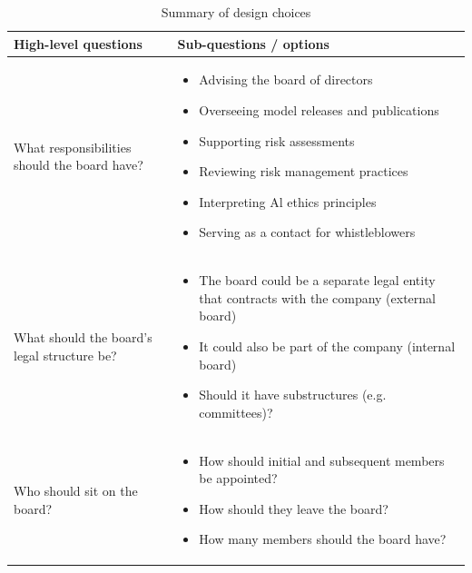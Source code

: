 \documentclass{article}
\begin{document}
\begin{table}
  \caption{Summary of design choices}
  \label{table2}
  \centering
  \begin{tabularx}{\textwidth}{p{4.5cm} X}
    \toprule
        \textbf{High-level questions} & \textbf{Sub-questions / options} \\
    \midrule
        What responsibilities should the board have? &
            \vspace{-0.7em} \begin{itemize}[leftmargin=*, nosep]
                \item Advising the board of directors
                \item Overseeing model releases and publications
                \item Supporting risk assessments
                \item Reviewing risk management practices
                \item Interpreting Al ethics principles
                \item Serving as a contact for whistleblowers \vspace{-0.2em}
            \end{itemize} \\
        \vspace{-1.4em} What should the board's legal structure be? &
            \begin{itemize}[leftmargin=*, nosep] \vspace{-1em}
                \item The board could be a separate legal entity that contracts with the company (external board)
                \item It could also be part of the company (internal board)
                \item Should it have substructures (e.g. committees)? \vspace{-0.2em}
            \end{itemize} \\
        \vspace{-1.4em} Who should sit on the board? &
            \begin{itemize}[leftmargin=*, nosep] \vspace{-1em}
                \item How should initial and subsequent members be appointed?
                \item How should they leave the board?
                \item How many members should the board have?

\end{itemize}
\end{tabularx}
\end{table}
\end{document}
